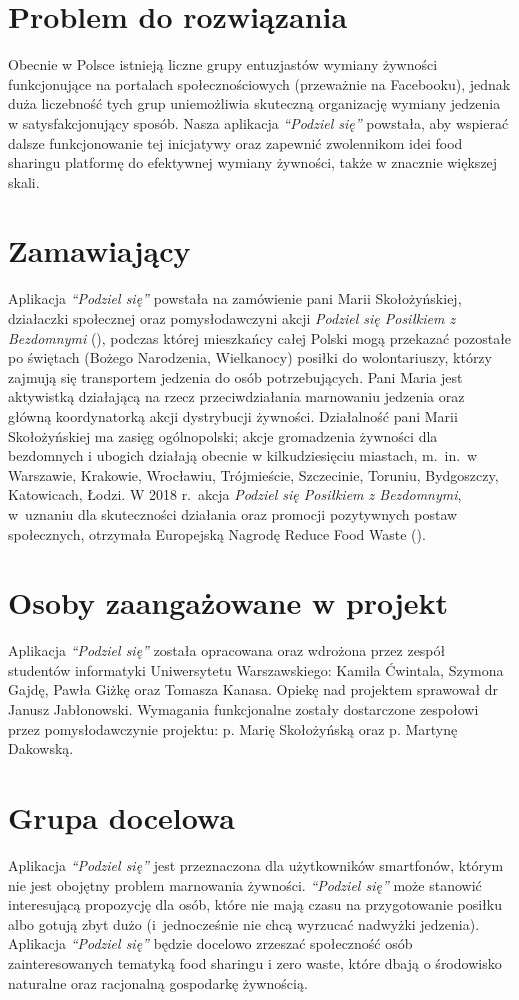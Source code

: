 \documentclass[licencjacka]{pracamgr}
\begin{document}
\section*{Problem do rozwiązania}
Obecnie w Polsce istnieją liczne grupy entuzjastów wymiany żywności funkcjonujące na portalach społecznościowych (przeważnie na Facebooku), jednak duża liczebność tych grup uniemożliwia skuteczną organizację wymiany jedzenia w satysfakcjonujący sposób. Nasza aplikacja \textit{``Podziel się''} powstała, aby wspierać dalsze funkcjonowanie tej inicjatywy oraz zapewnić zwolennikom idei food sharingu platformę do efektywnej wymiany żywności, także w znacznie większej skali.

\section*{Zamawiający}
Aplikacja \textit{``Podziel się''} powstała na zamówienie pani Marii Skołożyńskiej, działaczki społecznej oraz pomysłodawczyni akcji \textit{Podziel się Posiłkiem z Bezdomnymi} (\cite{podzielmysie}), podczas której mieszkańcy całej Polski mogą przekazać pozostałe po świętach (Bożego Narodzenia, Wielkanocy) posiłki do wolontariuszy, którzy zajmują się transportem jedzenia do osób potrzebujących. Pani Maria jest aktywistką działającą na rzecz przeciwdziałania marnowaniu jedzenia oraz główną koordynatorką akcji dystrybucji żywności. Działalność pani Marii Skołożyńskiej ma zasięg ogólnopolski; akcje gromadzenia żywności dla bezdomnych i ubogich działają obecnie w kilkudziesięciu miastach, m.\ in.\ w Warszawie, Krakowie, Wrocławiu, Trójmieście, Szczecinie, Toruniu, Bydgoszczy, Katowicach, Łodzi. W 2018 r.\ akcja \textit{Podziel się Posiłkiem z Bezdomnymi}, w~uznaniu dla skuteczności działania oraz promocji pozytywnych postaw społecznych, otrzymała Europejską Nagrodę Reduce Food Waste (\cite{rfw}).

\section*{Osoby zaangażowane w projekt}
Aplikacja \textit{``Podziel się''} została opracowana oraz wdrożona przez zespół studentów informatyki Uniwersytetu Warszawskiego: Kamila Ćwintala, Szymona Gajdę, Pawła Giżkę oraz Tomasza Kanasa. Opiekę nad projektem sprawował dr Janusz Jabłonowski. Wymagania funkcjonalne zostały dostarczone zespołowi przez pomysłodawczynie projektu: p. Marię Skołożyńską oraz p. Martynę Dakowską.

\section*{Grupa docelowa}
Aplikacja \textit{``Podziel się''} jest przeznaczona dla użytkowników smartfonów, którym nie jest obojętny problem marnowania żywności. \textit{``Podziel się''} może stanowić interesującą propozycję dla osób, które nie mają czasu na przygotowanie posiłku albo gotują zbyt dużo (i~jednocześnie nie chcą wyrzucać nadwyżki jedzenia). Aplikacja \textit{``Podziel się''} będzie docelowo zrzeszać społeczność osób zainteresowanych tematyką food sharingu i zero waste, które dbają o środowisko naturalne oraz racjonalną gospodarkę żywnością.
\end{document}
